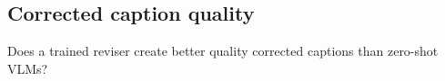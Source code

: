 \begin{table}[htb] \caption{Hallucination detection on LID (real tagged hallucinations) vs LID (artificial hallucinations)} \centering
\end{table}

\begin{table}[htb] \caption{Hallucination detection on new dataset (real tagged hallucinations) vs new dataset (artificial hallucinations)} \centering
\end{table}

\FloatBarrier
\subsection{Corrected caption quality}
\begin{formal}
	Does a trained reviser create better quality corrected captions than zero-shot VLMs?
\end{formal}
